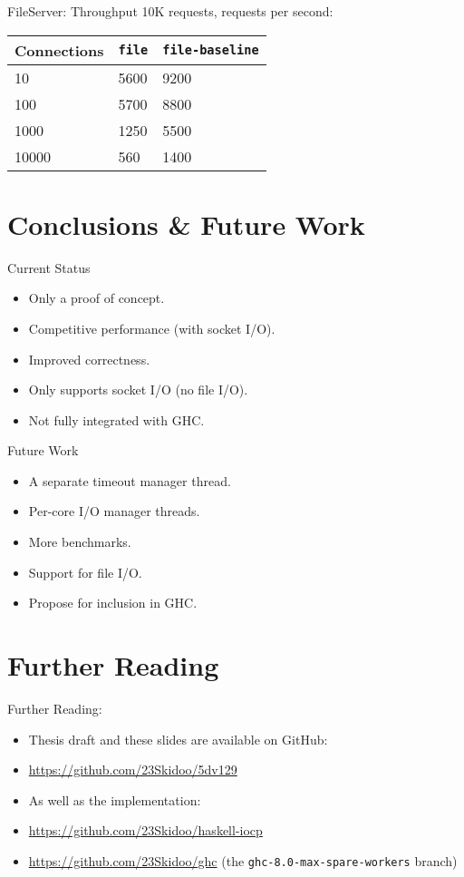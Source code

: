 \documentclass{beamer}
\begin{document}
\begin{frame}{FileServer: Throughput}
  10K requests, requests per second:
\begin{tabular}{ | l | l | l | }
  \hline
  Connections & \texttt{file} & \texttt{file-baseline} \\
  \hline
  10 & 5600 & 9200 \\
  \hline
  100 & 5700 & 8800 \\
  \hline
  1000 & 1250 & 5500 \\
  \hline
  10000 & 560 & 1400 \\
  \hline
\end{tabular}
\end{frame}

\section {Conclusions \& Future Work}

\begin{frame}{Current Status}
  \begin{itemize}
  \item Only a proof of concept.
  \item Competitive performance (with socket I/O).
  \item Improved correctness.
  \item Only supports socket I/O (no file I/O).
  \item Not fully integrated with GHC.
  \end{itemize}
\end{frame}

\begin{frame}{Future Work}
  \begin{itemize}
  \item A separate timeout manager thread.
  \item Per-core I/O manager threads.
  \item More benchmarks.
  \item Support for file I/O.
  \item Propose for inclusion in GHC.
  \end{itemize}
\end{frame}

\section {Further Reading}

\begin{frame}{Further Reading: }
  \begin{itemize}
  \item Thesis draft and these slides are available on GitHub:
  \item \url{https://github.com/23Skidoo/5dv129}
  \item As well as the implementation:
  \item \url{https://github.com/23Skidoo/haskell-iocp}
  \item \url{https://github.com/23Skidoo/ghc} (the
    \texttt{ghc-8.0-max-spare-workers} branch)
  \end{itemize}
\end{frame}
\end{document}
